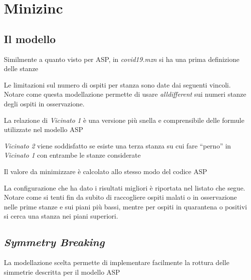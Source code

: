 
\section{Minizinc}
\subsection{Il modello}
Similmente a quanto visto per ASP, in \emph{covid19.mzn} si ha una prima definizione delle stanze


\noindent
Le limitazioni sul numero di ospiti per stanza sono date dai seguenti vincoli.
Notare come questa modellazione permette di usare \emph{alldifferent} sui numeri stanze degli ospiti in osservazione.


\noindent
La relazione di \emph{Vicinato 1} è una versione più snella e comprensibile delle formule utilizzate nel modello ASP


\noindent
\emph{Vicinato 2} viene soddisfatto se esiste una terza stanza su cui fare ``perno'' in \emph{Vicinato 1} con entrambe le stanze considerate


\noindent
Il valore da minimizzare è calcolato allo stesso modo del codice ASP


\noindent
La configurazione che ha dato i risultati migliori è riportata nel listato che segue.
Notare come si tenti fin da subito di raccogliere ospiti malati o in osservazione nelle prime stanze e sui piani più bassi, mentre per ospiti in quarantena o positivi si cerca una stanza nei piani superiori.


\subsection{\emph{Symmetry Breaking}}
La modellazione scelta permette di implementare facilmente la rottura delle simmetrie descritta per il modello ASP

